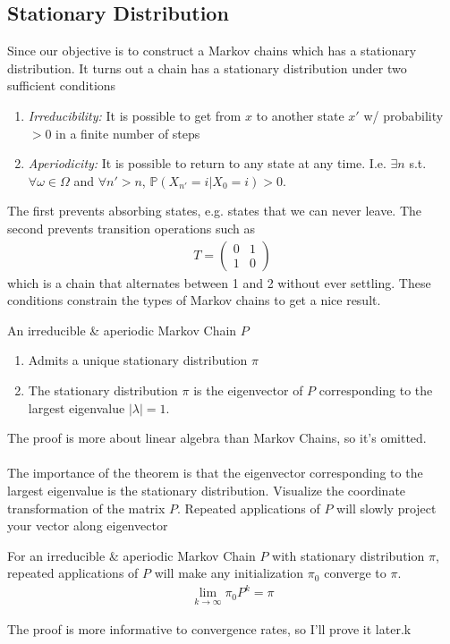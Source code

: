 \subsection{Stationary Distribution}
Since our objective is to construct a Markov chains which has a stationary distribution. It turns out a chain has a stationary distribution under two sufficient conditions
\begin{enumerate}
	\item \emph{Irreducibility:} It is possible to get from $x$ to another state $x'$ w/ probability $>0$ in a finite number of steps
	\item \emph{Aperiodicity:} It is possible to return to any state at any time. I.e. $\exists n$ s.t. $\forall \omega \in \Omega$ and $\forall n ' > n$, $\mathbb P(X_{n'} = i | X_0 = i) >0$.
\end{enumerate}
The first prevents absorbing states, e.g. states that we can never leave. The second prevents transition operations such as
\begin{align}
	T = \begin{pmatrix}
		0 & 1 \\ 1 & 0
	\end{pmatrix}
\end{align}
which is a chain that alternates between 1 and 2 without ever settling. These conditions constrain the types of Markov chains to get a nice result.
\begin{theorem}
	 An irreducible \& aperiodic Markov Chain $P$ 
	\begin{enumerate}
		\item Admits a unique stationary distribution $\pi$
		\item The stationary distribution $\pi$ is the eigenvector of $P$ corresponding to the largest eigenvalue $|\lambda| = 1$.
	\end{enumerate}
\end{theorem}
The proof is more about linear algebra than Markov Chains, so it's omitted.\\
\\
The importance of the theorem is that the eigenvector corresponding to the largest eigenvalue is the stationary distribution. Visualize the coordinate transformation of the matrix $P$. Repeated applications of $P$ will slowly project your vector along eigenvector
\begin{fact} For an irreducible \& aperiodic Markov Chain $P$ with stationary distribution $\pi$, repeated applications of $P$ will make any initialization $\pi_0$ converge to $\pi$.
	\begin{align}
		\lim_{k \to \infty} \pi_0 P^k = \pi
	\end{align}
\end{fact}
The proof is more informative to convergence rates, so I'll prove it later.k


